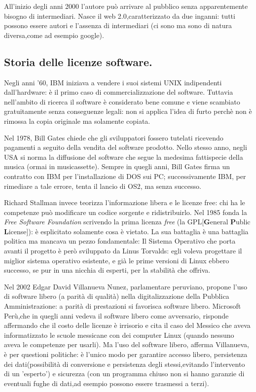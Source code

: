\documentclass[a4page, 11pt, twocolumn]{article}
\begin{document}
All'inizio degli anni 2000 l'autore può arrivare al pubblico senza apparentemente bisogno di intermediari. Nasce il web 2.0,caratterizzato da due inganni: tutti possono essere autori e l'assenza di intermediari (ci sono ma sono di natura diversa,come ad esempio google).

\subsection{Storia delle licenze software.}
Negli anni '60, IBM iniziava a vendere i suoi sistemi UNIX indipendenti dall'hardware: è il primo caso di commercializzazione del software.
Tuttavia nell'ambito di ricerca il software è considerato bene comune e viene scambiato gratuitamente senza conseguenze legali: non si applica l'idea di furto perchè non è rimossa la copia originale ma solamente copiata.

Nel 1978, Bill Gates chiede che gli sviluppatori fossero tutelati ricevendo pagamenti a seguito della vendita del software prodotto. Nello stesso anno, negli USA si norma la diffusione del software che segue la medesima fattispecie della musica (ormai in musicassette).
Sempre in quegli anni, Bill Gates firma un contratto con IBM per l'installazione di DOS sui PC; successivamente IBM, per rimediare a tale errore, tenta il lancio di OS2, ma senza successo.

Richard Stallman invece teorizza l'informazione libera e le licenze free: chi ha le competenze può modificare un codice sorgente e ridistribuirlo.
Nel 1985 fonda la \textit{Free Software Foundation} scrivendo la prima licenza \textit{free} (la GPL[\textbf{G}eneral \textbf{P}ublic \textbf{L}icense]): è esplicitato solamente cosa è vietato. La sua battaglia è una battaglia politica ma mancava un pezzo fondamentale: Il Sistema Operativo che porta avanti il progetto è però sviluppato da Linus Torvalds: egli voleva progettare il miglior sistema operativo esistente, e già le prime versioni di Linux ebbero successo, se pur in una nicchia di esperti, per la stabilità che offriva. \newline

Nel 2002 Edgar David Villanueva Nunez, parlamentare peruviano, propone l'uso di software libero (a parità di qualità) nella digitalizzazione della Pubblica Amministrazione: a parità di prestazioni si favorisca software libero.
Microsoft Perù,che in quegli anni vedeva il software libero come avversario, risponde affermando che il costo delle licenze è irrisorio e cita il caso del Messico che aveva informatizzato le scuole messicane con dei computer Linux (quando nessuno aveva le competenze per usarli).
Ma l'uso del software libero, afferma Villanueva, è per questioni politiche: è l'unico modo per garantire accesso libero, persistenza dei dati(possibilità di conversione e persistenza degli stessi,evitando l'intervento di un 'esperto') e sicurezza (con un programma chiuso non si hanno garanzie di eventuali fughe di dati,ad esempio possono essere trasmessi a terzi). \newline
\end{document}
